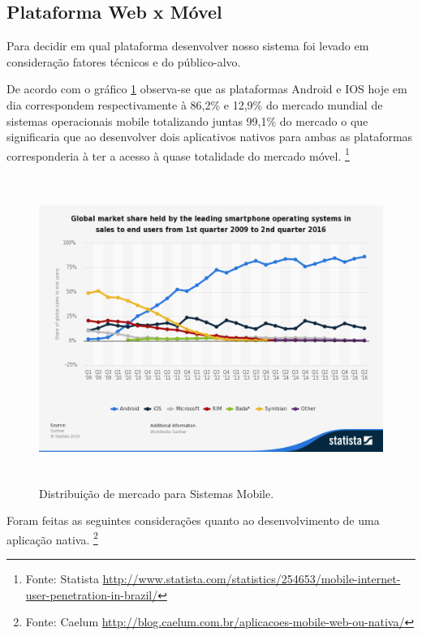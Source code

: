 \subsection{Plataforma Web x Móvel}
\par Para decidir em qual plataforma desenvolver nosso sistema foi levado em consideração fatores técnicos e do público-alvo.
\par De acordo com o gráfico \ref{fig:global_market_sharing} observa-se que as plataformas Android e IOS hoje em dia correspondem respectivamente à 86,2\% e 12,9\% do mercado mundial de sistemas operacionais mobile totalizando juntas 99,1\% do mercado o que significaria que ao desenvolver dois aplicativos nativos para ambas as plataformas corresponderia à ter a acesso à quase totalidade do mercado móvel. \footnote{Fonte: Statista \url{http://www.statista.com/statistics/254653/mobile-internet-user-penetration-in-brazil/}}
\begin{figure}[htb]
\includegraphics[height=10cm]{figuras/global_market_sharing}
\caption{\label{fig:global_market_sharing} Distribuição de mercado para Sistemas Mobile.}
\end{figure}
\par Foram feitas as seguintes considerações quanto ao desenvolvimento de uma aplicação nativa. \footnote{Fonte: Caelum \url{http://blog.caelum.com.br/aplicacoes-mobile-web-ou-nativa/}}
